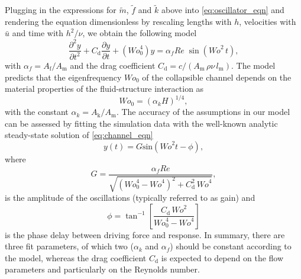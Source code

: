 \documentclass[aps,prl,reprint,superscriptaddress,floatfix]{revtex4-1}
\newcommand{\Rey}{\mathit{Re}}
\newcommand{\Wo}{\mathit{Wo}}
\begin{document}
Plugging in the expressions for $\tilde m$,  $\tilde f$ and $\tilde k$ above into \eqref{eq:oscillator_eqn} and rendering the equation dimensionless by rescaling lengths with $h$, velocities with $\bar{u}$ and time with $h^2/\nu$, we obtain the following model 
\begin{equation}
\frac{\partial^2 y}{\partial t^2}+C_\text{d}\frac{\partial y}{\partial t}+\left(\Wo^4_0\right)y={\alpha_f}{\Rey}\;\sin\left(\Wo^2 \, t\right),
\label{eq:channel_eqn}
\end{equation}
with $\alpha_f=A_\text{f}/A_\text{m}$ and the drag coefficient $C_\text{d}=c/(A_\text{m}\,\rho\nu\,l_\text{m})$. The model predicts that the eigenfrequency $\Wo_0$ of the collapsible channel depends on the material properties of the fluid-structure interaction as
\begin{equation}\label{eq:model_St0}
\Wo_0=({\alpha_k}H)^{1/4},
\end{equation}
with the constant $\alpha_k=A_\text{k}/A_\text{m}$. The accuracy of the assumptions in our model can be assessed by fitting the simulation data with the well-known analytic steady-state solution of \eqref{eq:channel_eqn} 
\begin{equation}
y(t)=G \text{sin}\left(\Wo^2  t-\phi\right),
\label{eq:channel_solution}
\end{equation}
where 
\begin{equation}
G = \dfrac{{\alpha_f}{\Rey}}{\sqrt{\left(\Wo^4_0-\Wo^4\right)^2+C_\text{d}^2\,\Wo^4}},
\label{eq:channel_gain}
\end{equation}
is the amplitude of the oscillations (typically referred to as gain) and 
\begin{equation}
\phi=\tan^{-1}\left[\dfrac{C_\text{d}\, \Wo^2}{\Wo_0^4-\Wo^4}\right]
\label{eq:channel_phase}
\end{equation}
is the phase delay between driving force and response. In summary, there are three fit parameters, of which two ($\alpha_k$ and $\alpha_f$) should be constant according to the model, whereas the drag coefficient $C_\text{d}$ is expected to depend on the flow parameters and particularly on the Reynolds number. 
\end{document}
